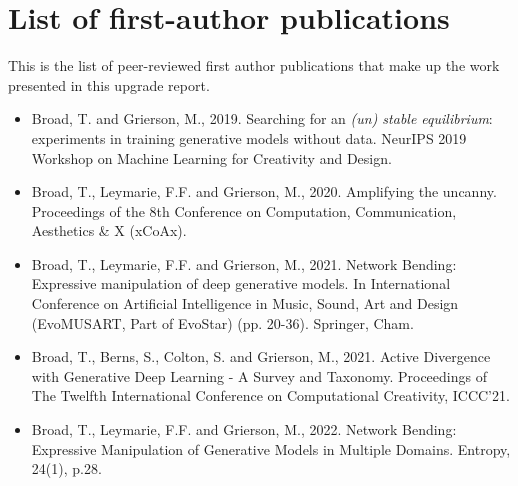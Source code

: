 \chapter*{List of first-author publications}

This is the list of peer-reviewed first author publications that make up the work presented in this upgrade report. 
\begin{itemize}
\item Broad, T. and Grierson, M., 2019. Searching for an \textit{(un) stable equilibrium}: experiments in training generative models without data. NeurIPS 2019 Workshop on Machine Learning for Creativity and Design. 
\item Broad, T., Leymarie, F.F. and Grierson, M., 2020. Amplifying the uncanny. Proceedings of the 8th Conference on Computation, Communication, Aesthetics \& X (xCoAx).
\item Broad, T., Leymarie, F.F. and Grierson, M., 2021. Network Bending: Expressive manipulation of deep generative models. In International Conference on Artificial Intelligence in Music, Sound, Art and Design (EvoMUSART, Part of EvoStar) (pp. 20-36). Springer, Cham.
\item Broad, T., Berns, S., Colton, S. and Grierson, M., 2021. Active Divergence with Generative Deep Learning - A Survey and Taxonomy. Proceedings of The Twelfth International Conference on Computational Creativity, ICCC’21. 
\item Broad, T., Leymarie, F.F. and Grierson, M., 2022. Network Bending: Expressive Manipulation of Generative Models in Multiple Domains. Entropy, 24(1), p.28.
\end{itemize}